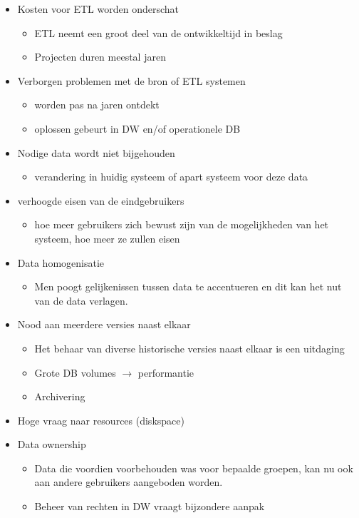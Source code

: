 \documentclass[a4paper,12pt]{article}
\begin{document}
\begin{itemize}
\item Kosten voor ETL worden onderschat
	\begin{itemize}
	\item ETL neemt een groot deel van de ontwikkeltijd in beslag
	\item Projecten duren meestal jaren
	\end{itemize}
\item Verborgen problemen met de bron of ETL systemen
	\begin{itemize}
	\item worden pas na jaren ontdekt
	\item oplossen gebeurt in DW en/of operationele DB
	\end{itemize}
\item Nodige data wordt niet bijgehouden
	\begin{itemize}
	\item verandering in huidig systeem of apart systeem voor deze data
	\end{itemize}
\item verhoogde eisen van de eindgebruikers
	\begin{itemize}
	\item hoe meer gebruikers zich bewust zijn van de mogelijkheden van het systeem, hoe meer ze zullen eisen
	\end{itemize}
\item Data homogenisatie
	\begin{itemize}
	\item Men poogt gelijkenissen tussen data te accentueren en dit kan het nut van de data verlagen.
	\end{itemize}
\item Nood aan meerdere versies naast elkaar
	\begin{itemize}
	\item Het behaar van diverse historische versies naast elkaar is een uitdaging
	\item Grote DB volumes $\rightarrow$ performantie
	\item Archivering
	\end{itemize}
\item Hoge vraag naar resources (diskspace)
\item Data ownership
	\begin{itemize}
	\item Data die voordien voorbehouden was voor bepaalde groepen, kan nu ook aan andere gebruikers aangeboden worden.
	\item Beheer van rechten in DW vraagt bijzondere aanpak

\end{itemize}
\end{itemize}
\end{document}
